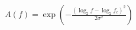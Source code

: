 \documentclass[preview]{standalone}
\begin{document}
\begin{align*}
A(f) = \exp\left(-\frac{(\log_2 f - \log_2 f_c)^2}{2\sigma^2}\right)
\end{align*}
\end{document}
